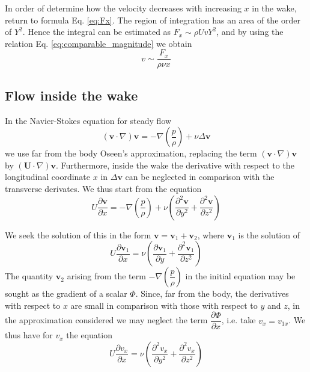 \documentclass[conference]{IEEEtran}
\theoremstyle{definition}
\theoremstyle{remark}
\begin{document}
    In order of determine how the velocity decreases with increasing $x$ in the wake, return to formula Eq. \ref{eq:Fx}. The region of integration has an area of the order of $Y^2$. Hence the integral can be estimated as $F_x \sim \rho U v Y^2$, and by using the relation Eq. \ref{eq:comparable_magnitude} we obtain
    \begin{equation}
        v \sim \dfrac{F_x}{\rho \nu x}
    \end{equation}

    \subsection{Flow inside the wake}
    In the Navier-Stokes equation for steady flow
    \begin{equation}
        (\mathbf{v} \cdot \nabla) \mathbf{v} = - \nabla \left(\dfrac{p}{\rho}\right) + \nu \Delta \mathbf{v}
    \end{equation}
    we use far from the body Oseen's approximation, replacing the term $(\mathbf{v} \cdot \nabla) \mathbf{v}$ by $(\mathbf{U} \cdot \nabla) \mathbf{v}$. Furthermore, inside the wake the derivative with respect to the longitudinal coordinate $x$ in $\Delta \mathbf{v}$ can be neglected in comparison with the transverse derivates. We thus start from the equation
    \begin{equation}
        U \dfrac{\partial \mathbf{v}}{\partial x} = - \nabla \left(\dfrac{p}{\rho}\right) + \nu \left( \dfrac{\partial^2 \mathbf{v}}{\partial y^2} + \dfrac{\partial^2 \mathbf{v}}{\partial z^2}\right)
    \end{equation}

    We seek the solution of this in the form $\mathbf{v} = \mathbf{v}_1 + \mathbf{v}_2$, where $\mathbf{v}_1$ is the solution of
    \begin{equation}
        U \dfrac{\partial \mathbf{v}_1}{\partial x} = \nu \left( \dfrac{\partial \mathbf{v}_1}{\partial y} + \dfrac{\partial^2 \mathbf{v}_1}{\partial z^2} \right)
    \end{equation}
    The quantity $\mathbf{v}_2$ arising from the term $-\nabla \left( \dfrac{p}{\rho} \right)$ in the initial equation may be sought as the gradient of a scalar $\Phi$. Since, far from the body, the derivatives with respect to $x$ are small in comparison with those with respect to $y$ and $z$, in the approximation considered we may neglect the term $\dfrac{\partial \Phi}{\partial x}$, i.e. take $v_x = v_{1x}$. We thus have for $v_x$ the equation
    \begin{equation}
        U \dfrac{\partial v_x}{\partial x} = \nu \left( \dfrac{\partial^2 v_x}{\partial y^2} + \dfrac{\partial^2 v_x}{\partial z^2} \right)
    \end{equation}
\end{document}
